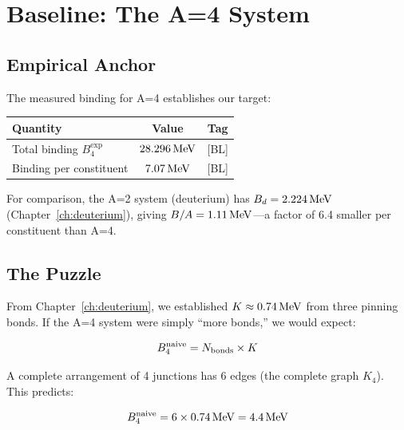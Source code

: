 \section{Baseline: The A=4 System}
\label{sec:he4:baseline}

\subsection{Empirical Anchor}

The measured binding for A=4 establishes our target:

\begin{resultbox}
    \begin{center}
    \begin{tabular}{lcc}
        \toprule
        Quantity & Value & Tag \\
        \midrule
        Total binding $B_4^{\text{exp}}$ & $28.296\,\mathrm{MeV}$ & [BL] \\
        Binding per constituent & $7.07\,\mathrm{MeV}$ & [BL] \\
        \bottomrule
    \end{tabular}
    \end{center}
    \tagBL
\end{resultbox}

For comparison, the A=2 system (deuterium) has $B_d = 2.224\,\mathrm{MeV}$
(Chapter~\ref{ch:deuterium}), giving $B/A = 1.11\,\mathrm{MeV}$---a factor
of 6.4 smaller per constituent than A=4. \tagBL

\subsection{The Puzzle}

From Chapter~\ref{ch:deuterium}, we established $K \approx 0.74\,\mathrm{MeV}$
from three pinning bonds. If the A=4 system were simply ``more bonds,''
we would expect:

\begin{equation}
    B_4^{\text{naive}} = N_{\text{bonds}} \times K
    \label{eq:naive_bond}
\end{equation}

A complete arrangement of 4 junctions has 6 edges (the complete
graph $K_4$). This predicts:

\begin{equation}
    B_4^{\text{naive}} = 6 \times 0.74\,\mathrm{MeV} = 4.4\,\mathrm{MeV}
    \label{eq:naive_result}
\end{equation}

